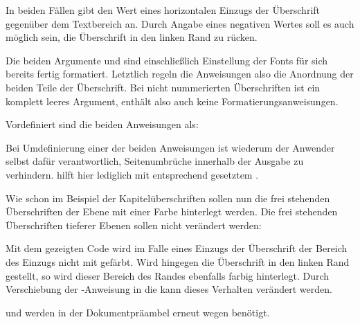 In beiden Fällen gibt  den Wert eines horizontalen Einzugs
der Überschrift gegenüber dem Textbereich an. Durch Angabe eines negativen
Wertes soll es auch möglich sein, die Überschrift in den linken Rand zu
rücken.

Die beiden Argumente  und  sind einschließlich
Einstellung der Fonts für sich bereits fertig formatiert. Letztlich regeln die
Anweisungen also die Anordnung der beiden Teile der Überschrift. Bei nicht
nummerierten Überschriften ist  ein komplett leeres Argument,
enthält also auch keine Formatierungsanweisungen.

Vordefiniert sind die beiden Anweisungen als:
\begin{lstcode}
\newcommand{\sectionlinesformat}[4]{%
  \@hangfrom{\hskip #2#3}{#4}%
}
\newcommand{\sectioncatchphraseformat}[4]{\hskip #2#3#4}
\end{lstcode}

Bei Umdefinierung einer der beiden Anweisungen ist wiederum der Anwender
selbst dafür verantwortlich, Seitenumbrüche innerhalb der Ausgabe zu
verhindern. \KOMAScript{} hilft hier lediglich mit entsprechend gesetztem
.

\begin{Example}
  Wie schon im Beispiel der Kapitelüberschriften sollen nun die frei stehenden
  Überschriften der Ebene  mit einer Farbe hinterlegt
  werden. Die frei stehenden Überschriften tieferer Ebenen sollen nicht
  verändert werden:
\begin{lstcode}[moretexcs={colorbox}]
  \makeatletter
  \renewcommand{\sectionlinesformat}[4]{%
    \Ifstr{#1}{section}{%
      \hspace*{#2}%
      \colorbox{yellow}{%
        \parbox{\dimexpr\linewidth
                        -2\fboxrule-2\fboxsep-#2}{%
          \raggedsection
          \@hangfrom{#3}{#4}%
        }%
      }%
    }{%
      \@hangfrom{\hskip #2#3}{#4}%
    }%
  }
  \makeatother
\end{lstcode}
  Mit dem gezeigten Code wird im Falle eines Einzugs der Überschrift der
  Bereich des Einzugs nicht mit gefärbt. Wird hingegen die Überschrift in den
  linken Rand gestellt, so wird dieser Bereich des Randes ebenfalls farbig
  hinterlegt. Durch Verschiebung der -Anweisung in die
   kann dieses Verhalten verändert werden.%
  \iffalse Umbruchkorrekturtext
  
  Erneut sei daran erinnert, dass \Macro{makeatletter} und \Macro{makeatother}
  nur in der Dokumentpräambel zu verwenden sind. In einer eigenen
  Wrapper-Klasse oder einem Paket haben sie zu entfallen. Sie werden auch nur
  wegen \Macro{@hangfrom} in der Definition von \Macro{sectionlinesformat}
  benötigt.%
  \else%

   und  werden in der Dokumentpräambel
  erneut wegen  benötigt.%
  \fi%
\end{Example}

